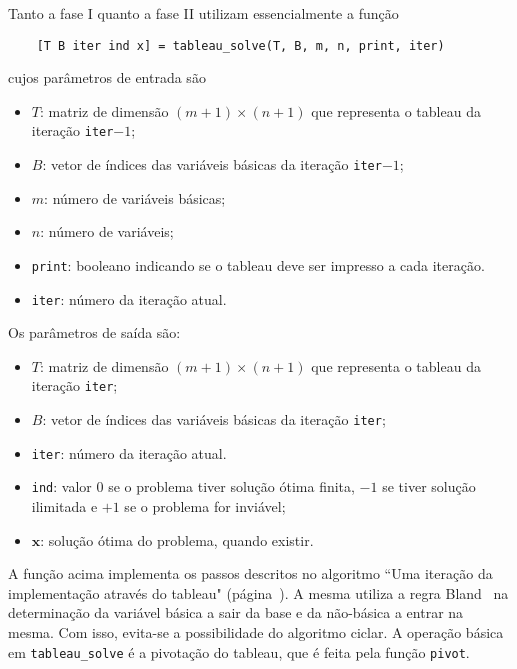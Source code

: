 \documentclass[12pt,a4paper]{article}
\newcommand{\vet}{\mathbf}                                   %
\begin{document}
Tanto a fase I quanto a fase II utilizam essencialmente a função
%
\begin{verbatim}
	[T B iter ind x] = tableau_solve(T, B, m, n, print, iter)
\end{verbatim}
%
cujos parâmetros de entrada são
%
\begin{itemize}
	\item $T$: matriz de dimensão $(m+1) \times (n+1)$ que representa o tableau da iteração 
	\verb|iter|$ - 1$;
	\item $B$: vetor de índices das variáveis básicas da iteração \verb|iter|$ - 1$;
	\item $m$: número de variáveis básicas;
	\item $n$: número de variáveis;
	\item \verb|print|: booleano indicando se o tableau deve ser impresso a cada iteração.  
	\item \verb|iter|: número da iteração atual.
\end{itemize} 
%
Os parâmetros de saída são:
%
\begin{itemize}
	\item $T$: matriz de dimensão $(m+1) \times (n+1)$ que representa o tableau da iteração 
	\verb|iter|;
	\item $B$: vetor de índices das variáveis básicas da iteração \verb|iter|;
	\item \verb|iter|: número da iteração atual.
	\item \verb|ind|: valor $0$ se o problema tiver solução ótima finita, $-1$ se tiver solução
	ilimitada e $+1$ se o problema for inviável;
	\item $\vet{x}$: solução ótima do problema, quando existir.
\end{itemize}
%
A função acima implementa os passos descritos no algoritmo ``Uma iteração da implementação através 
do tableau" (página~\pageref{iteracao}). A mesma utiliza a regra Bland~\cite{bertsimas} na 
determinação da variável básica a sair da base e da não-básica a entrar na mesma. Com isso,
evita-se a possibilidade do algoritmo ciclar. A operação básica em \verb|tableau_solve| é a 
pivotação do tableau, que é feita pela função \verb|pivot|.
\end{document}
